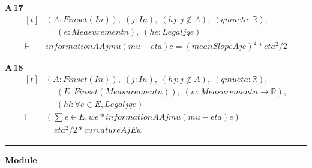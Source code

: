 \noindent\textbf{A\,17}\quad{}
{\footnotesize\[ \begin{aligned}[t]
&(\mathit{A} : \mathit{Finset} (\mathit{I} \mathit{n})),\; (\mathit{j} : \mathit{I} \mathit{n}),\; (\mathit{hj} : \mathit{j} \notin \mathit{A}),\; (\mathit{q} \mathit{mu} \mathit{eta} : \mathbb{R} ),\\
&\quad \; (\mathit{e} : \mathit{Measurement} \mathit{n}),\; (\mathit{he} : \mathit{Legal} \mathit{j} \mathit{q} \mathit{e})\\
\vdash\;&\mathit{information} \mathit{A} \mathit{A} \mathit{j} \mathit{mu} (\mathit{mu}-\mathit{eta}) \mathit{e} = (\mathit{meanSlope} \mathit{A} \mathit{j} \mathit{e})^{2}*\mathit{eta}^{2}/2
\end{aligned} \]}

\noindent\textbf{A\,18}\quad{}
{\footnotesize\[ \begin{aligned}[t]
&(\mathit{A} : \mathit{Finset} (\mathit{I} \mathit{n})),\; (\mathit{j} : \mathit{I} \mathit{n}),\; (\mathit{hj} : \mathit{j} \notin \mathit{A}),\; (\mathit{q} \mathit{mu} \mathit{eta} : \mathbb{R} ),\\
&\quad \; (\mathit{E} : \mathit{Finset} (\mathit{Measurement} \mathit{n})),\; (\mathit{w} : \mathit{Measurement} \mathit{n} \to \mathbb{R} ),\\
&\quad \; (\mathit{hl} : \forall \mathit{e} \in \mathit{E}, \mathit{Legal} \mathit{j} \mathit{q} \mathit{e})\\
\vdash\;&(\textstyle\sum \mathit{e} \in \mathit{E}, \mathit{w} \mathit{e} * \mathit{information} \mathit{A} \mathit{A} \mathit{j} \mathit{mu} (\mathit{mu}-\mathit{eta}) \mathit{e}) =\\
&\quad \mathit{eta}^{2}/2 * \mathit{curvature} \mathit{A} \mathit{j} \mathit{E} \mathit{w}
\end{aligned} \]}

\vspace{4pt}\noindent\rule{\columnwidth}{0.4pt}\par\vspace{2pt}
\noindent\textbf{Module }\par\vspace{3pt}

